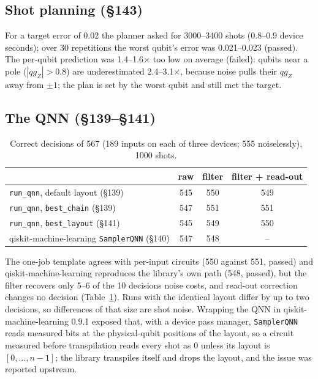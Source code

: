\documentclass[11pt]{article}
\newcommand{\qZ}{qg_Z}
\begin{document}
\subsection{Shot planning (§143)}

For a target error of 0.02 the planner asked for 3000--3400 shots (0.8--0.9 device seconds); over 30
repetitions the worst qubit's error was 0.021--0.023 (passed). The per-qubit prediction was 1.4--1.6$\times$
too low on average (failed): qubits near a pole ($|\qZ|>0.8$) are underestimated 2.4--3.1$\times$, because
noise pulls their $\qZ$ away from $\pm1$; the plan is set by the worst qubit and still met the target.

\subsection{The QNN (§139--§141)}

\begin{table}[h]
\centering\small
\begin{tabular}{lccc}
\toprule
 & raw & filter & filter + read-out\\
\midrule
\texttt{run\_qnn}, default layout (§139) & 545 & 550 & 549\\
\texttt{run\_qnn}, \texttt{best\_chain} (§139) & 547 & 551 & 551\\
\texttt{run\_qnn}, \texttt{best\_layout} (§141) & 545 & 549 & 550\\
qiskit-machine-learning \texttt{SamplerQNN} (§140) & 547 & 548 & --\\
\bottomrule
\end{tabular}
\caption{Correct decisions of 567 (189 inputs on each of three devices; 555 noiselessly), 1000 shots.}
\label{tab:qnn}
\end{table}

The one-job template agrees with per-input circuits (550 against 551, passed) and qiskit-machine-learning
reproduces the library's own path (548, passed), but the filter recovers only 5--6 of the 10 decisions noise
costs, and read-out correction changes no decision (Table~\ref{tab:qnn}). Runs with the identical layout
differ by up to two decisions, so differences of that size are shot noise. Wrapping the QNN in
qiskit-machine-learning 0.9.1 exposed that, with a device pass manager, \texttt{SamplerQNN} reads measured
bits at the physical-qubit positions of the layout, so a circuit measured before transpilation reads every
shot as 0 unless its layout is $[0,\dots,n-1]$; the library transpiles itself and drops the layout, and the
issue was reported upstream.
\end{document}
